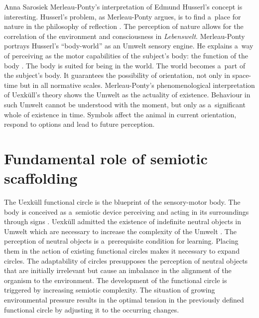 \begin{artengenv}{Anna Sarosiek}
Merleau-Ponty’s interpretation of Edmund Husserl’s concept is interesting. Husserl’s problem, as Merleau-Ponty argues, is to find a~place for nature in the philosophy of reflection
\parencite[][p.72]{merleau-ponty_nature_2003}. %
 The perception of nature allows for the correlation of the environment and consciousness in \textit{Lebenswelt}. Merleau-Ponty portrays Husserl’s ``body-world'' as an Umwelt sensory engine. He explains a~way of perceiving as the motor capabilities of the subject’s body: the function of the body 
\parencite[][p.74]{merleau-ponty_nature_2003}. %
 The body is suited for being in the world. The world becomes a~part of the subject’s body. It guarantees the possibility of orientation, not only in space-time but in all normative scales. Merleau-Ponty’s phenomenological interpretation of Uexküll’s theory shows the Umwelt as the actuality of existence. Behaviour in such Umwelt cannot be understood with the moment, but only as a~significant whole of existence in time. Symbols affect the animal in current orientation, respond to options and lead to future perception.

\section*{Fundamental role of semiotic scaffolding}
The Uexküll functional circle is the blueprint of the sensory-motor body. The body is conceived as a~semiotic device perceiving and acting in its surroundings through signs
\parencite[][p.261]{heidegger_grundbegriffe_1992}. %
 Uexküll admitted the existence of indefinite neutral objects in Umwelt which are necessary to increase the complexity of the Umwelt 
\parencite[][pp.92–93]{uexkull_streifzuge_1934}. %
 The perception of neutral objects is a~prerequisite condition for learning. Placing them in the action of existing functional circles makes it necessary to expand circles. The adaptability of circles presupposes the perception of neutral objects that are initially irrelevant but cause an imbalance in the alignment of the organism to the environment. The development of the functional circle is triggered by increasing semiotic complexity. The situation of growing environmental pressure results in the optimal tension in the previously defined functional circle by adjusting it to the occurring changes.


\end{artengenv}
